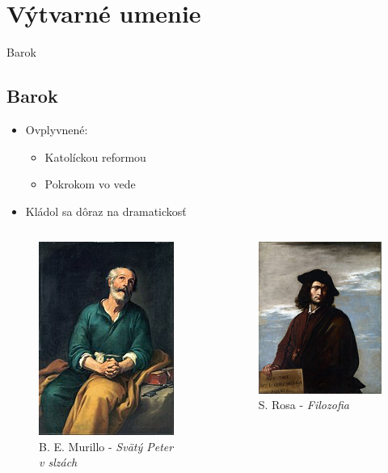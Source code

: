 \documentclass[dvipsnames]{beamer}
\begin{document}
\section{Výtvarné umenie}
\frame{\sectionpage}
\begin{frame}{Barok}
	\subsection{Barok}
	\begin{itemize}
		\item Ovplyvnené:
		      \begin{itemize}
			      \item Katolíckou reformou
			      \item Pokrokom vo vede
		      \end{itemize}
		\item Kládol sa dôraz na dramatickosť
	\end{itemize}
	\begin{columns}
		\kern0pt
		\begin{figure}
			\includegraphics[scale=0.5]{slzi}
			\caption{\textcolor{BurntOrange}{B. E. Murillo}  - \textit{Svätý Peter v slzách}}

		\end{figure}%

		\begin{figure}
			\includegraphics[scale=0.5]{filo}
			\caption{\textcolor{BurntOrange}{S. Rosa} - \textit{Filozofia}}
		\end{figure}
	\end{columns}
\end{frame}
\end{document}
